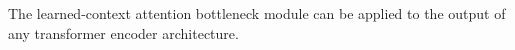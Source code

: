 
%

%
The learned-context attention bottleneck module can be applied to the output of any transformer encoder architecture.

\noindent 


